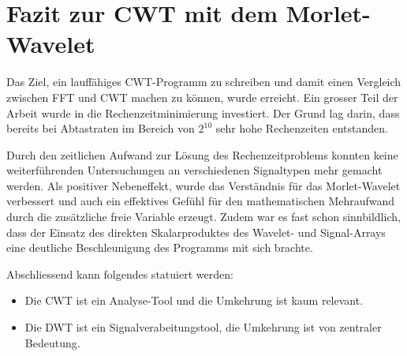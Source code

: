 %
%
%
%
\section{Fazit zur CWT mit dem Morlet-Wavelet
	\label{wavelets:section:teil6}}

Das Ziel, ein lauffähiges CWT-Programm zu schreiben und damit einen
Vergleich zwischen FFT und CWT machen zu können, wurde erreicht.
Ein grosser Teil der Arbeit wurde in die Rechenzeitminimierung
investiert.
Der Grund lag darin, dass bereits bei Abtastraten im Bereich von
$2^{10}$ sehr hohe Rechenzeiten entstanden.

Durch den zeitlichen Aufwand zur Lösung des Rechenzeitproblems
konnten keine weiterführenden Untersuchungen an verschiedenen
Signaltypen mehr gemacht werden.
Als positiver Nebeneffekt, wurde das Verständnis für das Morlet-Wavelet
verbessert und auch ein effektives Gefühl für den mathematischen
Mehraufwand durch die zusätzliche freie Variable erzeugt.
Zudem war es fast schon sinnbildlich, dass der Einsatz des direkten
Skalarproduktes des Wavelet- und Signal-Arrays eine deutliche
Beschleunigung des Programms mit sich brachte.

Abschliessend kann folgendes statuiert werden:

\begin{itemize}
	\item Die CWT ist ein Analyse-Tool und die Umkehrung ist kaum relevant.
	\item Die DWT ist ein Signalverabeitungstool, die Umkehrung
	ist von zentraler Bedeutung.
\end{itemize}
